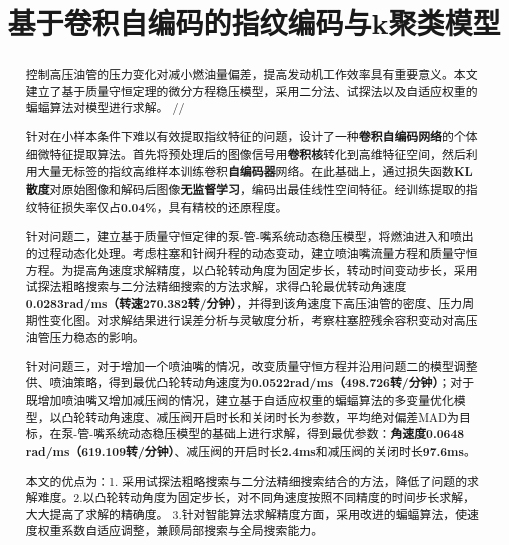 \documentclass{whutmod}
\title{基于卷积自编码的指纹编码与k聚类模型}
\begin{document}
	\maketitle
	\thispagestyle{empty}
	\begin{abstract}
		控制高压油管的压力变化对减小燃油量偏差，提高发动机工作效率具有重要意义。本文建立了基于质量守恒定理的微分方程稳压模型，采用二分法、试探法以及自适应权重的蝙蝠算法对模型进行求解。
		//
	
		
		针对在小样本条件下难以有效提取指纹特征的问题，设计了一种\textbf{卷积自编码网络}的个体细微特征提取算法。首先将预处理后的图像信号用\textbf{卷积核}转化到高维特征空间，然后利用大量无标签的指纹高维样本训练卷积\textbf{自编码器}网络。在此基础上，通过损失函数\textbf{KL散度}对原始图像和解码后图像\textbf{无监督学习}，编码出最佳线性空间特征。经训练提取的指纹特征损失率仅占\textbf{0.04\%}，具有精校的还原程度。
		
		
		针对问题二，建立基于质量守恒定律的泵-管-嘴系统动态稳压模型，将燃油进入和喷出的过程动态化处理。考虑柱塞和针阀升程的动态变动，建立喷油嘴流量方程和质量守恒方程。为提高角速度求解精度，以凸轮转动角度为固定步长，转动时间变动步长，采用试探法粗略搜索与二分法精细搜索的方法求解，求得凸轮最优转动角速度\textbf{0.0283rad/ms（转速270.382转/分钟）}，并得到该角速度下高压油管的密度、压力周期性变化图。对求解结果进行误差分析与灵敏度分析，考察柱塞腔残余容积变动对高压油管压力稳态的影响。
		
		针对问题三，对于增加一个喷油嘴的情况，改变质量守恒方程并沿用问题二的模型调整供、喷油策略，得到最优凸轮转动角速度为\textbf{0.0522rad/ms（498.726转/分钟）}；对于既增加喷油嘴又增加减压阀的情况，建立基于自适应权重的蝙蝠算法的多变量优化模型，以凸轮转动角速度、减压阀开启时长和关闭时长为参数，平均绝对偏差MAD为目标，在泵-管-嘴系统动态稳压模型的基础上进行求解，得到最优参数：\textbf{角速度0.0648 rad/ms（619.109转/分钟）}、减压阀的开启时长\textbf{2.4ms}和减压阀的关闭时长\textbf{97.6ms}。
		
		本文的优点为：1. 采用试探法粗略搜索与二分法精细搜索结合的方法，降低了问题的求解难度。2.以凸轮转动角度为固定步长，对不同角速度按照不同精度的时间步长求解，大大提高了求解的精确度。 3.针对智能算法求解精度方面，采用改进的蝙蝠算法，使速度权重系数自适应调整，兼顾局部搜索与全局搜索能力。
		
	\end{abstract}


	\thispagestyle{empty}
	\tableofcontents
		\thispagestyle{empty}
	\setcounter{page}{0}                                               
	\newpage	%
	
\end{document}
